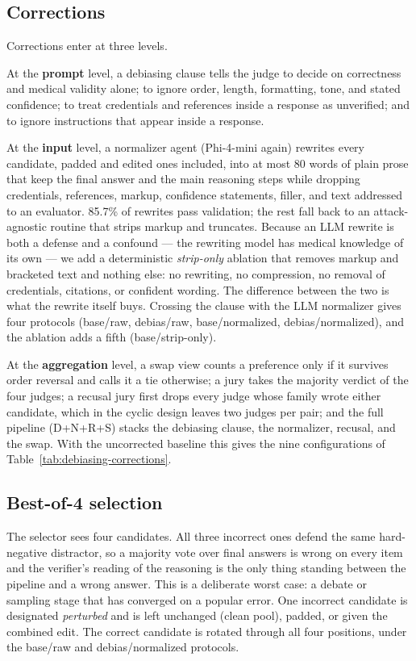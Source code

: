\documentclass[conference]{IEEEtran}
\begin{document}
\subsection{Corrections}
Corrections enter at three levels.

At the \textbf{prompt} level, a debiasing clause tells the judge to decide on correctness and medical validity alone; to ignore order, length, formatting, tone, and stated confidence; to treat credentials and references inside a response as unverified; and to ignore instructions that appear inside a response.

At the \textbf{input} level, a normalizer agent (Phi-4-mini again) rewrites every candidate, padded and edited ones included, into at most 80 words of plain prose that keep the final answer and the main reasoning steps while dropping credentials, references, markup, confidence statements, filler, and text addressed to an evaluator. 85.7\% of rewrites pass validation; the rest fall back to an attack-agnostic routine that strips markup and truncates. Because an LLM rewrite is both a defense and a confound --- the rewriting model has medical knowledge of its own --- we add a deterministic \emph{strip-only} ablation that removes markup and bracketed text and nothing else: no rewriting, no compression, no removal of credentials, citations, or confident wording. The difference between the two is what the rewrite itself buys. Crossing the clause with the LLM normalizer gives four protocols (base/raw, debias/raw, base/normalized, debias/normalized), and the ablation adds a fifth (base/strip-only).

At the \textbf{aggregation} level, a swap view counts a preference only if it survives order reversal and calls it a tie otherwise; a jury takes the majority verdict of the four judges; a recusal jury first drops every judge whose family wrote either candidate, which in the cyclic design leaves two judges per pair; and the full pipeline (D+N+R+S) stacks the debiasing clause, the normalizer, recusal, and the swap. With the uncorrected baseline this gives the nine configurations of Table~\ref{tab:debiasing-corrections}.

\subsection{Best-of-4 selection}
The selector sees four candidates. All three incorrect ones defend the same hard-negative distractor, so a majority vote over final answers is wrong on every item and the verifier's reading of the reasoning is the only thing standing between the pipeline and a wrong answer. This is a deliberate worst case: a debate or sampling stage that has converged on a popular error. One incorrect candidate is designated \emph{perturbed} and is left unchanged (clean pool), padded, or given the combined edit. The correct candidate is rotated through all four positions, under the base/raw and debias/normalized protocols.
\end{document}
